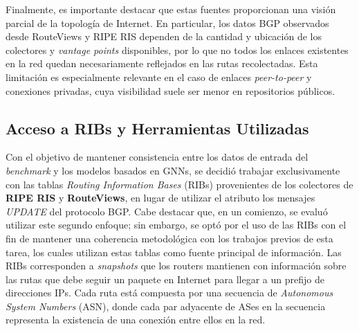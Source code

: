 Finalmente, es importante destacar que estas fuentes proporcionan una visión parcial de la topología de Internet. En particular, los datos BGP observados desde RouteViews y RIPE RIS dependen de la cantidad y ubicación de los colectores y \textit{vantage points} disponibles, por lo que no todos los enlaces existentes en la red quedan necesariamente reflejados en las rutas recolectadas. Esta limitación es especialmente relevante en el caso de enlaces \textit{peer-to-peer} y conexiones privadas, cuya visibilidad suele ser menor en repositorios públicos.\\

\subsection{Acceso a RIBs y Herramientas Utilizadas}

Con el objetivo de mantener consistencia entre los datos de entrada del \textit{benchmark} y los modelos basados en GNNs, se decidió trabajar exclusivamente con las tablas \textit{Routing Information Bases} (RIBs) provenientes de los colectores de \textbf{RIPE RIS} y \textbf{RouteViews}, en lugar de utilizar el atributo los mensajes \textit{UPDATE} del protocolo BGP. Cabe destacar que, en un comienzo, se evaluó utilizar este segundo enfoque; sin embargo, se optó por el uso de las RIBs con el fin de mantener una coherencia metodológica con los trabajos previos de esta tarea, los cuales utilizan estas tablas como fuente principal de información.
Las RIBs corresponden a \textit{snapshots} que los routers mantienen con información sobre las rutas que debe seguir un paquete en Internet para llegar a un prefijo de direcciones IPs. Cada ruta está compuesta por una secuencia de \textit{Autonomous System Numbers} (ASN), donde cada par adyacente de ASes en la secuencia representa la existencia de una conexión entre ellos en la red.\\


